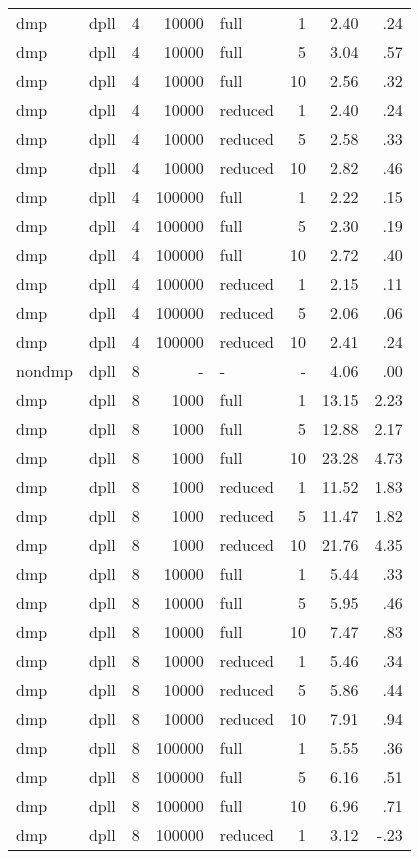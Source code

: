 \begin{center}
\begin{small}
\begin{longtable}{llrrlrrr}
dmp & dpll & 4 & 10000 & full & 1 & 2.40 & .24\\
dmp & dpll & 4 & 10000 & full & 5 & 3.04 & .57\\
dmp & dpll & 4 & 10000 & full & 10 & 2.56 & .32\\
dmp & dpll & 4 & 10000 & reduced & 1 & 2.40 & .24\\
dmp & dpll & 4 & 10000 & reduced & 5 & 2.58 & .33\\
dmp & dpll & 4 & 10000 & reduced & 10 & 2.82 & .46\\
dmp & dpll & 4 & 100000 & full & 1 & 2.22 & .15\\
dmp & dpll & 4 & 100000 & full & 5 & 2.30 & .19\\
dmp & dpll & 4 & 100000 & full & 10 & 2.72 & .40\\
dmp & dpll & 4 & 100000 & reduced & 1 & 2.15 & .11\\
dmp & dpll & 4 & 100000 & reduced & 5 & 2.06 & .06\\
dmp & dpll & 4 & 100000 & reduced & 10 & 2.41 & .24\\
\hline
nondmp & dpll & 8 & - & - & - & 4.06 & .00\\
dmp & dpll & 8 & 1000 & full & 1 & 13.15 & 2.23\\
dmp & dpll & 8 & 1000 & full & 5 & 12.88 & 2.17\\
dmp & dpll & 8 & 1000 & full & 10 & 23.28 & 4.73\\
dmp & dpll & 8 & 1000 & reduced & 1 & 11.52 & 1.83\\
dmp & dpll & 8 & 1000 & reduced & 5 & 11.47 & 1.82\\
dmp & dpll & 8 & 1000 & reduced & 10 & 21.76 & 4.35\\
dmp & dpll & 8 & 10000 & full & 1 & 5.44 & .33\\
dmp & dpll & 8 & 10000 & full & 5 & 5.95 & .46\\
dmp & dpll & 8 & 10000 & full & 10 & 7.47 & .83\\
dmp & dpll & 8 & 10000 & reduced & 1 & 5.46 & .34\\
dmp & dpll & 8 & 10000 & reduced & 5 & 5.86 & .44\\
dmp & dpll & 8 & 10000 & reduced & 10 & 7.91 & .94\\
dmp & dpll & 8 & 100000 & full & 1 & 5.55 & .36\\
dmp & dpll & 8 & 100000 & full & 5 & 6.16 & .51\\
dmp & dpll & 8 & 100000 & full & 10 & 6.96 & .71\\
dmp & dpll & 8 & 100000 & reduced & 1 & 3.12 & -.23\\

\end{longtable}
\end{small}
\end{center}
